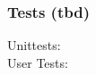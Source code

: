 \documentclass[main.tex]{subfiles} %
\begin{document}
\subsubsection{Tests (tbd)}

Unittests:
\\
User Tests:
\end{document}
